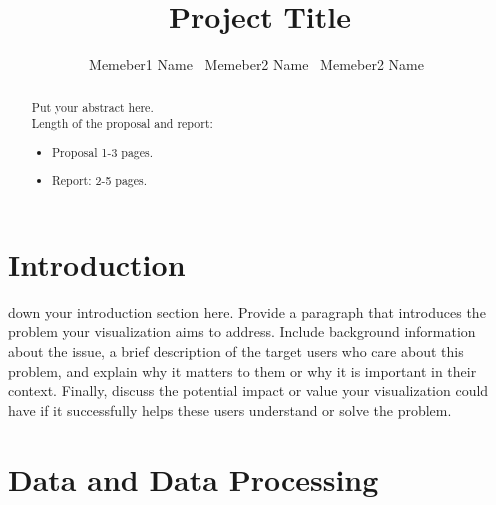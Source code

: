 \documentclass[journal]{IEEEtran}
\begin{document}
    \title{Project Title}
  \author{Memeber1 Name~
      Memeber2 Name~
      Memeber2 Name~
}  




\maketitle



\begin{abstract}
Put your abstract here.\\

Length of the proposal and report: 
\begin{itemize}
    \item Proposal 1-3 pages. 
    \item Report: 2-5 pages.
\end{itemize}
\end{abstract}



\IEEEpeerreviewmaketitle



\section{Introduction}

 down your introduction section here. Provide a paragraph that introduces the problem your visualization aims to address. Include background information about the issue, a brief description of the target users who care about this problem, and explain why it matters to them or why it is important in their context. Finally, discuss the potential impact or value your visualization could have if it successfully helps these users understand or solve the problem.


\section{Data and Data Processing}
\end{document}

